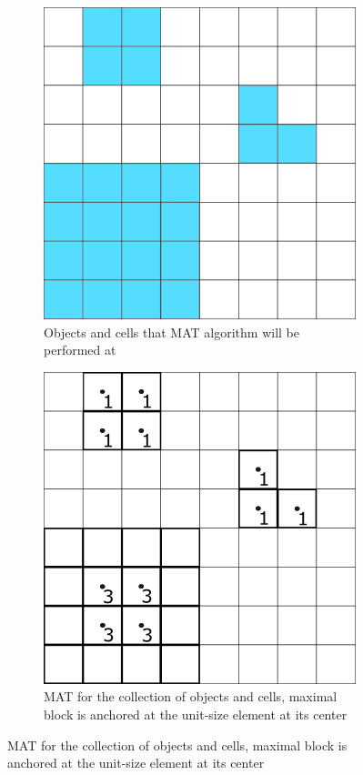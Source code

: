 \begin{figure}
\centering
\begin{subfigure}[t]{.48\textwidth}
 \centering
 \includegraphics[width=.8\linewidth]{MAT_todo.png}
  \caption{Objects and cells that MAT algorithm will be performed at}
  \label{fig:sub1}
\end{subfigure}%
\hfill%
\begin{subfigure}[t]{.48\textwidth}
 \centering
 \includegraphics[width=.8\linewidth]{MAT_done.png}
 \caption{MAT for the collection of objects and cells, maximal block is anchored at the unit-size element at its center}
\end{subfigure}
\end{figure}

